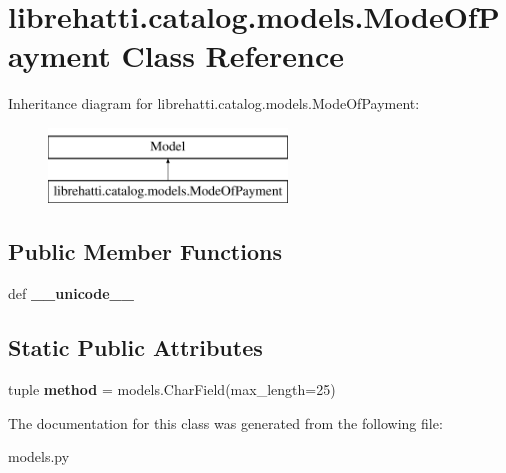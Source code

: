 \hypertarget{classlibrehatti_1_1catalog_1_1models_1_1ModeOfPayment}{\section{librehatti.\-catalog.\-models.\-Mode\-Of\-Payment Class Reference}
\label{classlibrehatti_1_1catalog_1_1models_1_1ModeOfPayment}
}
Inheritance diagram for librehatti.\-catalog.\-models.\-Mode\-Of\-Payment\-:\begin{figure}[H]
\begin{center}
\leavevmode
\includegraphics[height=2.000000cm]{classlibrehatti_1_1catalog_1_1models_1_1ModeOfPayment}
\end{center}
\end{figure}
\subsection*{Public Member Functions}
\begin{DoxyCompactItemize}
\item 
\hypertarget{classlibrehatti_1_1catalog_1_1models_1_1ModeOfPayment_ac4474fcac6e4a5f522dce7e071727967}{def {\bfseries \-\_\-\-\_\-unicode\-\_\-\-\_\-}}\label{classlibrehatti_1_1catalog_1_1models_1_1ModeOfPayment_ac4474fcac6e4a5f522dce7e071727967}

\end{DoxyCompactItemize}
\subsection*{Static Public Attributes}
\begin{DoxyCompactItemize}
\item 
\hypertarget{classlibrehatti_1_1catalog_1_1models_1_1ModeOfPayment_ae6576218cba66cc2fc8ea88b6e484dd1}{tuple {\bfseries method} = models.\-Char\-Field(max\-\_\-length=25)}\label{classlibrehatti_1_1catalog_1_1models_1_1ModeOfPayment_ae6576218cba66cc2fc8ea88b6e484dd1}

\end{DoxyCompactItemize}


The documentation for this class was generated from the following file\-:\begin{DoxyCompactItemize}
\item 
models.\-py\end{DoxyCompactItemize}
